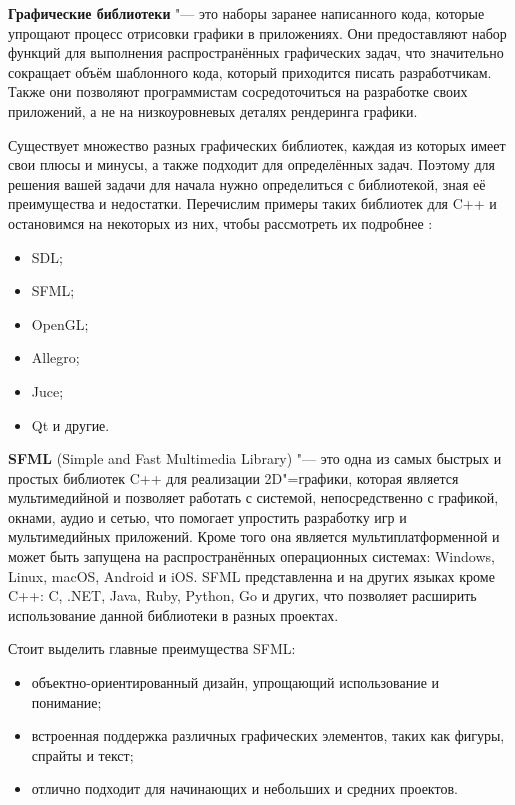 \textbf{Графические библиотеки} "--- это наборы заранее написанного кода, которые упрощают процесс отрисовки графики в приложениях. Они предоставляют набор функций для выполнения распространённых графических задач, что значительно сокращает объём шаблонного кода, который приходится писать разработчикам. Также они позволяют программистам сосредоточиться на разработке своих приложений, а не на низкоуровневых деталях рендеринга графики.

Существует множество разных графических библиотек, каждая из которых имеет свои плюсы и минусы, а также подходит для определённых задач. Поэтому для решения вашей задачи для начала нужно определиться с библиотекой, зная её преимущества и недостатки. Перечислим примеры таких библиотек для C++ и остановимся на некоторых из них, чтобы рассмотреть их подробнее \cite{graphics_libraries}:
\begin{itemize}
    \item SDL;
    \item SFML;
    \item OpenGL;
    \item Allegro;
    \item Juce;
    \item Qt и другие.
\end{itemize}

\textbf{SFML} (Simple and Fast Multimedia Library) "--- это одна из самых быстрых и простых библиотек C++ для реализации 2D"=графики, которая является мультимедийной и позволяет работать с системой, непосредственно с графикой, окнами, аудио и сетью, что помогает упростить разработку игр и мультимедийных приложений. Кроме того она является мультиплатформенной и может быть запущена на распространённых операционных системах: Windows, Linux, macOS, Android и iOS. SFML представленна и на других языках кроме C++: C, .NET, Java, Ruby, Python, Go и других, что позволяет расширить использование данной библиотеки в разных проектах\cite{sfml_doc}.

Стоит выделить главные преимущества SFML:
\begin{itemize}
    \item объектно-ориентированный дизайн, упрощающий использование и понимание;
    \item встроенная поддержка различных графических элементов, таких как фигуры, спрайты и текст;
    \item отлично подходит для начинающих и небольших и средних проектов.
\end{itemize}

